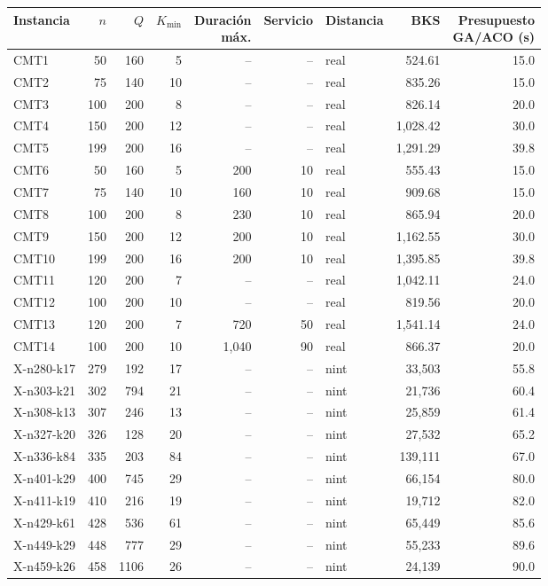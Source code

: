 \begin{tabular}{lrrrrrlrr}
\toprule
Instancia & $n$ & $Q$ & $K_{\min}$ & \makecell{Duración\\máx.} & Servicio & Distancia & BKS & \makecell{Presupuesto\\GA/ACO (s)} \\
\midrule
CMT1 & 50 & 160 & 5 & -- & -- & real & 524.61 & 15.0 \\
CMT2 & 75 & 140 & 10 & -- & -- & real & 835.26 & 15.0 \\
CMT3 & 100 & 200 & 8 & -- & -- & real & 826.14 & 20.0 \\
CMT4 & 150 & 200 & 12 & -- & -- & real & 1,028.42 & 30.0 \\
CMT5 & 199 & 200 & 16 & -- & -- & real & 1,291.29 & 39.8 \\
CMT6 & 50 & 160 & 5 & 200 & 10 & real & 555.43 & 15.0 \\
CMT7 & 75 & 140 & 10 & 160 & 10 & real & 909.68 & 15.0 \\
CMT8 & 100 & 200 & 8 & 230 & 10 & real & 865.94 & 20.0 \\
CMT9 & 150 & 200 & 12 & 200 & 10 & real & 1,162.55 & 30.0 \\
CMT10 & 199 & 200 & 16 & 200 & 10 & real & 1,395.85 & 39.8 \\
CMT11 & 120 & 200 & 7 & -- & -- & real & 1,042.11 & 24.0 \\
CMT12 & 100 & 200 & 10 & -- & -- & real & 819.56 & 20.0 \\
CMT13 & 120 & 200 & 7 & 720 & 50 & real & 1,541.14 & 24.0 \\
CMT14 & 100 & 200 & 10 & 1,040 & 90 & real & 866.37 & 20.0 \\
\midrule
X-n280-k17 & 279 & 192 & 17 & -- & -- & nint & 33,503 & 55.8 \\
X-n303-k21 & 302 & 794 & 21 & -- & -- & nint & 21,736 & 60.4 \\
X-n308-k13 & 307 & 246 & 13 & -- & -- & nint & 25,859 & 61.4 \\
X-n327-k20 & 326 & 128 & 20 & -- & -- & nint & 27,532 & 65.2 \\
X-n336-k84 & 335 & 203 & 84 & -- & -- & nint & 139,111 & 67.0 \\
X-n401-k29 & 400 & 745 & 29 & -- & -- & nint & 66,154 & 80.0 \\
X-n411-k19 & 410 & 216 & 19 & -- & -- & nint & 19,712 & 82.0 \\
X-n429-k61 & 428 & 536 & 61 & -- & -- & nint & 65,449 & 85.6 \\
X-n449-k29 & 448 & 777 & 29 & -- & -- & nint & 55,233 & 89.6 \\
X-n459-k26 & 458 & 1106 & 26 & -- & -- & nint & 24,139 & 90.0 \\
\bottomrule
\end{tabular}
